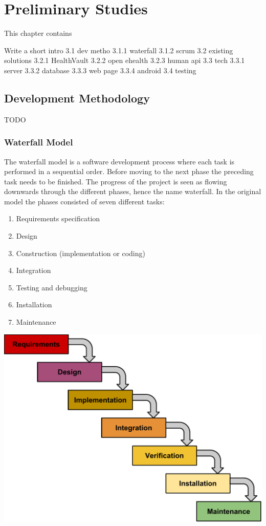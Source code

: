\chapter{Preliminary Studies}
\label{Preliminary Studies}

This chapter contains

Write a short intro 
3.1 dev metho
3.1.1 waterfall
3.1.2 scrum
3.2 existing solutions
3.2.1 HealthVault
3.2.2 open ehealth
3.2.3 human api
3.3 tech
3.3.1 server
3.3.2 database
3.3.3 web page
3.3.4 android
3.4 testing



\section{Development Methodology}

TODO

\subsection{Waterfall Model}

The waterfall model is a software development process where each task is performed in a sequential order.
Before moving to the next phase the preceding task needs to be finished.
The progress of the project is seen as flowing downwards through the different phases, hence the name waterfall.
In the original model the phases consisted of seven different tasks:


\begin{enumerate}
\item Requirements specification
\item Design
\item Construction (implementation or coding)
\item Integration
\item Testing and debugging
\item Installation
\item Maintenance
\end{enumerate}

\includegraphics[scale=0.6]{../Figures/Waterfall-model.pdf}

